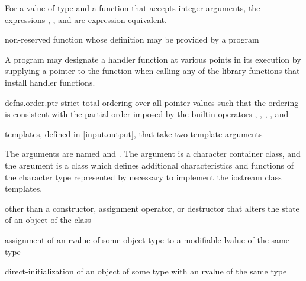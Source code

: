 \begin{example}
For a value  of type 
and a function  that accepts integer arguments,
the expressions
,
,
and
are expression-equivalent.
\end{example}

%
non-reserved function whose definition may be provided by a \Cpp{} program

\begin{defnote}
A \Cpp{} program may designate a handler function at various points in its execution by
supplying a pointer to the function when calling any of the library functions that install
handler functions.
\end{defnote}

{defns.order.ptr}
%
strict total ordering over all pointer values
such that the ordering is consistent with the partial order
imposed by the builtin operators
\tcode{<}, \tcode{>}, \tcode{<=}, \tcode{>=}, and \tcode{<=>}

templates, defined in \ref{input.output},
that take two template arguments

\begin{defnote}
The arguments are named
and
.
The argument
is a character container class,
and the argument
is a class which defines additional characteristics and functions
of the character type represented by
necessary to implement the iostream class templates.
\end{defnote}

%
 other than a constructor,
assignment operator, or destructor
that alters the state of an object of the class

%
assignment of an rvalue of some object type to a modifiable lvalue of the same type

%
direct-initialization of an object of some type with an rvalue of the same type

